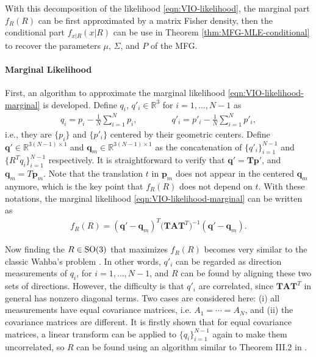 With this decomposition of the likelihood \eqref{eqn:VIO-likelihood}, the marginal part $f_R(R)$ can be first approximated by a matrix Fisher density, then the conditional part $f_{x|R}(x|R)$ can be use in Theorem \ref{thm:MFG-MLE-conditional} to recover the parameters $\mu$, $\Sigma$, and $P$ of the MFG.

\paragraph{Marginal Likelihood}

First, an algorithm to approximate the marginal likelihood \eqref{eqn:VIO-likelihood-marginal} is developed.
Define $q_i$, $q'_i\in\mathbb{R}^3$ for $i = 1,\ldots,N-1$ as
\begin{align} \label{eqn:VIO-centering}
	q_i = p_i-\frac{1}{N} \sum_{i=1}^N p_i, \qquad\qquad q'_i = p'_i - \frac{1}{N} \sum_{i=1}^N p'_i,
\end{align}
i.e., they are $\{p_i\}$ and $\{p'_i\}$ centered by their geometric centers.
Define $\bm{q'}\in\mathbb{R}^{3(N-1)\times 1}$ and $\bm{q}_m\in\mathbb{R}^{3(N-1)\times 1}$ as the concatenation of $\{q'_i\}_{i=1}^{N-1}$ and $\{R^Tq_i\}_{i=1}^{N-1}$ respectively.
It is straightforward to verify that $\bm{q}' = \mathbf{T}\bm{p}'$, and $\bm{q}_m = T\bm{p}_m$.
Note that the translation $t$ in $\bm{p}_m$ does not appear in the centered $\bm{q}_m$ anymore, which is the key point that $f_R(R)$ does not depend on $t$.
With these notations, the marginal likelihood \eqref{eqn:VIO-likelihood-marginal} can be written as
\begin{align} \label{eqn:VIO-likelihood-marginal-q}
	f_R(R) = (\bm{q}'-\bm{q}_m)^T \big(\mathbf{T}\mathbf{A}\mathbf{T}^T\big)^{-1} (\bm{q}'-\bm{q}_m).
\end{align}

Now finding the $R\in\mathrm{SO}(3)$ that maximizes $f_R(R)$ becomes very similar to the classic Wahba's problem \cite{markley1988attitude,shuster1981three}.
In other words, $q'_i$ can be regarded as direction measurements of $q_i$, for $i=1,\ldots,N-1$, and $R$ can be found by aligning these two sets of directions.
However, the difficulty is that $q'_i$ are correlated, since $\mathbf{T}\mathbf{A}\mathbf{T}^T$ in general has nonzero diagonal terms.
Two cases are considered here: (i) all measurements have equal covariance matrices, i.e. $A_1 = \cdots = A_N$, and (ii) the covariance matrices are different.
It is firstly shown that for equal covariance matrices, a linear transform can be applied to $\{q_i\}_{i=1}^{N-1}$ again to make them uncorrelated, so $R$ can be found using an algorithm similar to Theorem III.2 in \cite{lee2018bayesian}.

